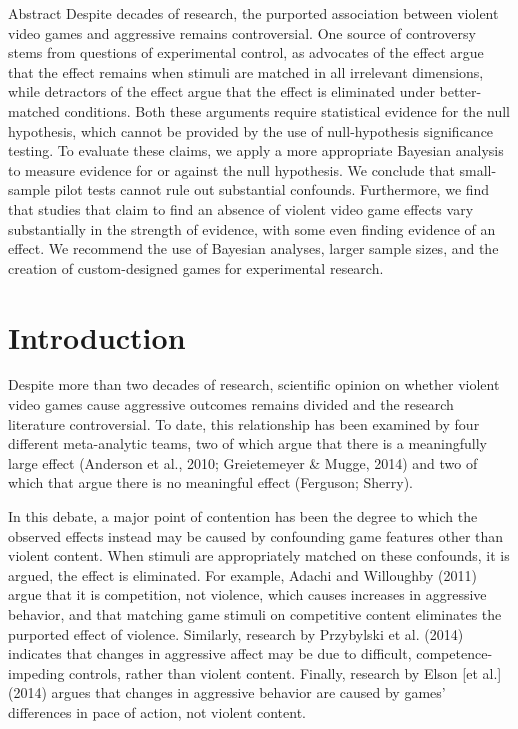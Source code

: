 \documentclass{article}
\begin{document}
\abstractname{Abstract}
Despite decades of research, the purported association between violent video games and aggressive remains controversial. One source of controversy stems from questions of experimental control, as advocates of the effect argue that the effect remains when stimuli are matched in all irrelevant dimensions, while detractors of the effect argue that the effect is eliminated under better-matched conditions. Both these arguments require statistical evidence for the null hypothesis, which cannot be provided by the use of null-hypothesis significance testing. To evaluate these claims, we apply a more appropriate Bayesian analysis to measure evidence for or against the null hypothesis. We conclude that small-sample pilot tests cannot rule out substantial confounds. Furthermore, we find that studies that claim to find an absence of violent video game effects vary substantially in the strength of evidence, with some even finding evidence of an effect. We recommend the use of Bayesian analyses, larger sample sizes, and the creation of custom-designed games for experimental research.
\newpage
\sloppy
\section*{Introduction}
Despite more than two decades of research, scientific opinion on whether violent video games cause aggressive outcomes remains divided and the research literature controversial. To date, this relationship has been examined by four different meta-analytic teams, two of which argue that there is a meaningfully large effect (Anderson et al., 2010; Greietemeyer \& Mugge, 2014) and two of which that argue there is no meaningful effect (Ferguson; Sherry). 

In this debate, a major point of contention has been the degree to which the observed effects instead may be caused by confounding game features other than violent content. When stimuli are appropriately matched on these confounds, it is argued, the effect is eliminated. For example, Adachi and Willoughby (2011) argue that it is competition, not violence, which causes increases in aggressive behavior, and that matching game stimuli on competitive content eliminates the purported effect of violence. Similarly, research by Przybylski et al. (2014) indicates that changes in aggressive affect may be due to difficult, competence-impeding controls, rather than violent content. Finally, research by Elson [et al.] (2014) argues that changes in aggressive behavior are caused by games’ differences in pace of action, not violent content. 
\end{document}

